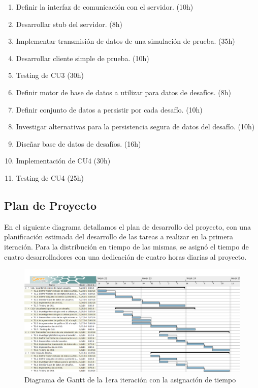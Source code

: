 \documentclass[a4paper, 10pt, twoside]{article}
\begin{document}
\begin{itemize}
\begin{enumerate}
  \item Definir la interfaz de comunicación con el servidor. (10h)
  \item Desarrollar stub del servidor. (8h)
  \item Implementar transmisión de datos de una simulación de prueba. (35h)
  \item Desarrollar cliente simple de prueba. (10h)
  \item Testing de CU3 (30h)
  \item Definir motor de base de datos a utilizar para datos de desafíos. (8h)
  \item Definir conjunto de datos a persistir por cada desafío. (10h)
  \item Investigar alternativas para la persistencia segura de datos del desafío. (10h)
  \item Diseñar base de datos de desafíos. (16h)
  \item Implementación de CU4 (30h)
  \item Testing de CU4 (25h)
\end{enumerate}
\end{itemize}

\subsection{Plan de Proyecto}

En el siguiente diagrama detallamos el plan de desarrollo del proyecto, con una planificación estimada del desarrollo de las tareas a realizar en la primera iteración. Para la distribución en tiempo de las mismas, se asignó el tiempo de cuatro desarrolladores con una dedicación de cuatro horas diarias al proyecto.


\begin{landscape}
\begin{center}
  \begin{figure}[h!]
    \includegraphics[width=25cm]{./diagramas/gantt.png}
    \caption{Diagrama de Gantt de la 1era iteración con la asignación de tiempo}
    \label{fig:gantt}
  \end{figure}
\end{center}
\end{landscape}
\newpage
\end{document}
